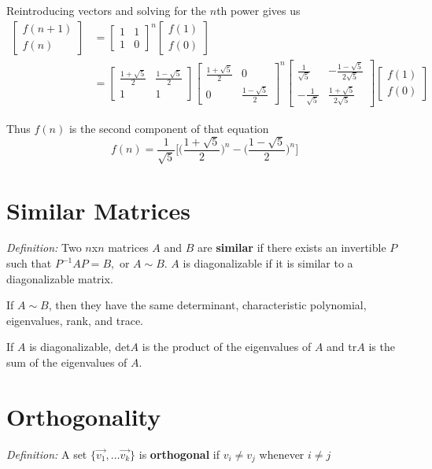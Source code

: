 \documentclass[12pt]{article}
\newcommand{\vectwo}[2]{\begin{bmatrix}#1\\#2\end{bmatrix}}
\begin{document}
Reintroducing vectors and solving for the $n$th power gives us
\begin{align*}
\vectwo{f(n+1)}{f(n)} &= \begin{bmatrix}1&1\\1&0\end{bmatrix}^n\vectwo{f(1)}{f(0)}\\
&= \begin{bmatrix}\frac{1+\sqrt{5}}{2}&\frac{1-\sqrt{5}}{2}\\1&1\end{bmatrix}\begin{bmatrix}\frac{1+\sqrt{5}}{2}&0\\0&\frac{1-\sqrt{5}}{2}\end{bmatrix}^n\begin{bmatrix}\frac{1}{\sqrt{5}}&-\frac{1-\sqrt{5}}{2\sqrt{5}}\\-\frac{1}{\sqrt{5}}&\frac{1+\sqrt{5}}{2\sqrt{5}}\end{bmatrix}\vectwo{f(1)}{f(0)}
\end{align*}

Thus $f(n)$ is the second component of that equation \[ f(n) = \frac{1}{\sqrt{5}}\bigg[\bigg(\frac{1+\sqrt{5}}{2}\bigg)^n - \bigg(\frac{1-\sqrt{5}}{2}\bigg)^n\bigg] \]

\section*{Similar Matrices}
\textit{Definition:} Two $n$x$n$ matrices $A$ and $B$ are {\bf similar} if there exists an invertible $P$ such that $P^{-1}AP = B,$ or $A \sim B$. $A$ is diagonalizable if it is similar to a diagonalizable matrix.

\begin{theorem}
If $A \sim B$, then they have the same determinant, characteristic polynomial, eigenvalues, rank, and trace.
\end{theorem}

\begin{theorem}
If $A$ is diagonalizable, det$A$ is the product of the eigenvalues of $A$ and tr$A$ is the sum of the eigenvalues of $A$.
\end{theorem}

\section*{Orthogonality}
\textit{Definition:} A set $\{\vec{v_1},\dots \vec{v_k}\}$ is {\bf orthogonal} if $v_i \neq v_j$ whenever $i \neq j$
\end{document}
